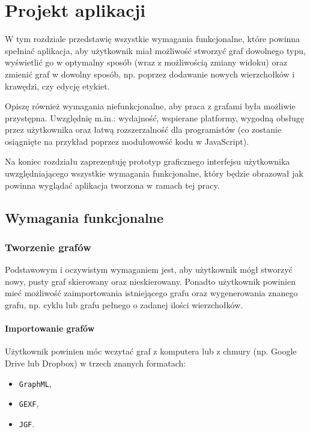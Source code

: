\chapter{Projekt aplikacji}

W tym rozdziale przedstawię wszystkie wymagania funkcjonalne, które powinna spełniać aplikacja, aby użytkownik miał możliwość stworzyć graf dowolnego typu, wyświetlić go w optymalny sposób (wraz z możliwością zmiany widoku) oraz zmienić graf w dowolny sposób, np. poprzez dodawanie nowych wierzchołków i krawędzi, czy edycję etykiet. 

Opiszę również wymagania niefunkcjonalne, aby praca z grafami była możliwie przystępna. Uwzględnię m.in.: wydajność, wspierane platformy, wygodną obsługę przez użytkownika oraz łatwą rozszerzalność dla programistów (co zostanie osiągnięte na przykład poprzez modułowowść kodu w JavaScript).

Na koniec rozdziału zaprezentuję prototyp graficznego interfejsu użytkownika uwzględniającego wszystkie wymagania funkcjonalne, który będzie obrazował jak powinna wyglądać aplikacja tworzona w ramach tej pracy. 

\section{Wymagania funkcjonalne}

\subsection{Tworzenie grafów}
Podstawowym i oczywistym wymaganiem jest, aby użytkownik mógł stworzyć nowy, pusty graf skierowany oraz nieskierowany. Ponadto użytkownik powinien mieć możliwość zaimportowania istniejącego grafu oraz wygenerowania znanego grafu, np. cyklu lub grafu pełnego o zadanej ilości wierzchołków. 

\subsubsection{Importowanie grafów} \label{subsubsec:import}
Użytkownik powinien móc wczytać graf z komputera lub z chmury (np. Google Drive lub Dropbox) w trzech znanych formatach: 

\begin{itemize}
\setlength\itemsep{0em}
\item \texttt{GraphML},
\item \texttt{GEXF},
\item \texttt{JGF}.
\end{itemize}

